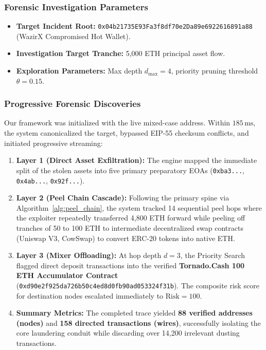 \subsubsection{Forensic Investigation Parameters}
\begin{itemize}
    \item \textbf{Target Incident Root:} \texttt{\small 0x04b21735E93Fa3f8df70e2Da89e6922616891a88} \\ (WazirX Compromised Hot Wallet).
    \item \textbf{Investigation Target Tranche:} 5,000 ETH principal asset flow.
    \item \textbf{Exploration Parameters:} Max depth $d_{\max} = 4$, priority pruning threshold $\theta = 0.15$.
\end{itemize}

\subsubsection{Progressive Forensic Discoveries}
Our framework was initialized with the live mixed-case address. Within $185\,\text{ms}$, the system canonicalized the target, bypassed EIP-55 checksum conflicts, and initiated progressive streaming:

\begin{enumerate}
    \item \textbf{Layer 1 (Direct Asset Exfiltration):} The engine mapped the immediate split of the stolen assets into five primary preparatory EOAs (\texttt{0xba3...}, \texttt{0x4ab...}, \texttt{0x92f...}).
    \item \textbf{Layer 2 (Peel Chain Cascade):} Following the primary spine via Algorithm~\ref{alg:peel_chain}, the system tracked 14 sequential peel hops where the exploiter repeatedly transferred 4,800 ETH forward while peeling off tranches of 50 to 100 ETH to intermediate decentralized swap contracts (Uniswap V3, CowSwap) to convert ERC-20 tokens into native ETH.
    \item \textbf{Layer 3 (Mixer Offloading):} At hop depth $d=3$, the Priority Search flagged direct deposit transactions into the verified \textbf{Tornado.Cash 100 ETH Accumulator Contract} (\texttt{\small 0xd90e2f925da726b50c4ed8d0fb90ad053324f31b}). The composite risk score for destination nodes escalated immediately to $\text{Risk} = 100$.
    \item \textbf{Summary Metrics:} The completed trace yielded \textbf{88 verified addresses (nodes)} and \textbf{158 directed transactions (wires)}, successfully isolating the core laundering conduit while discarding over 14,200 irrelevant dusting transactions.
\end{enumerate}

